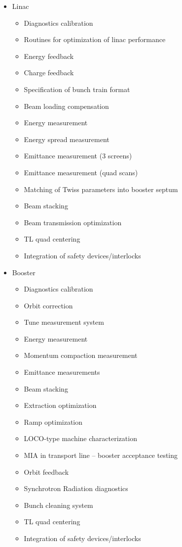\documentclass[letterpaper,showtrims]{memoir}
\begin{document}
\begin{itemize}

\item Linac
\begin{itemize}
\item Diagnostics calibration
\item Routines for optimization of linac performance
\item Energy feedback
\item Charge feedback
\item Specification of bunch train format    
\item Beam loading compensation      
\item Energy measurement     
\item Energy spread measurement      
\item Emittance measurement (3 screens)      
\item Emittance measurement (quad scans)     
\item Matching of Twiss parameters into booster septum       
\item Beam stacking  
\item Beam transmission optimization 
\item TL quad centering      
\item Integration of safety devices/interlocks       
\end{itemize}

\item Booster
\begin{itemize}
\item Diagnostics calibration       
\item Orbit correction       
\item Tune measurement system
\item Energy measurement     
\item Momentum compaction measurement
\item Emittance measurements 
\item Beam stacking  
\item Extraction optimization
\item Ramp optimization      
\item LOCO-type machine characterization     
\item MIA in transport line -- booster acceptance testing
\item Orbit feedback 
\item Synchrotron Radiation diagnostics      
\item Bunch cleaning system  
\item TL quad centering      
\item Integration of safety devices/interlocks       
\end{itemize} 


\end{itemize}
\end{document}
